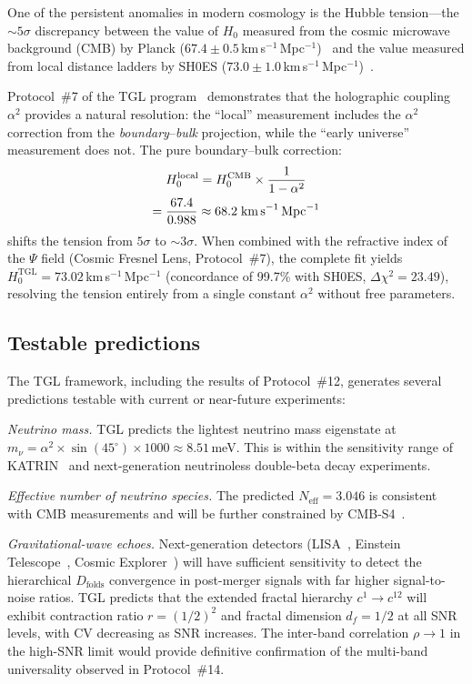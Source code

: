 \documentclass[12pt,a4paper,twocolumn]{article}
\newcommand{\alphaii}{\alpha^{2}}
\newcommand{\boundary}{\textit{boundary}}
\newcommand{\bulk}{\textit{bulk}}
\newcommand{\Dfolds}{D_{\text{folds}}}
\begin{document}
One of the persistent anomalies in modern cosmology is the Hubble tension---the $\sim 5\sigma$ discrepancy between the value of $H_0$ measured from the cosmic microwave background (CMB) by Planck ($67.4 \pm 0.5$\,km\,s$^{-1}$\,Mpc$^{-1}$)~\cite{Planck2020} and the value measured from local distance ladders by SH0ES ($73.0 \pm 1.0$\,km\,s$^{-1}$\,Mpc$^{-1}$)~\cite{Riess2022}.

Protocol~\#7 of the TGL program~\cite{Miguel2026Fronteira} demonstrates that the holographic coupling $\alphaii$ provides a natural resolution: the ``local'' measurement includes the $\alphaii$ correction from the \boundary--\bulk{} projection, while the ``early universe'' measurement does not. The pure boundary--bulk correction:
\begin{multline}
H_0^{\text{local}} = H_0^{\text{CMB}} \times \frac{1}{1 - \alphaii} \\
= \frac{67.4}{0.988} \approx 68.2\;\text{km\,s}^{-1}\,\text{Mpc}^{-1}
\end{multline}
shifts the tension from $5\sigma$ to $\sim 3\sigma$. When combined with the refractive index of the $\Psi$ field (Cosmic Fresnel Lens, Protocol~\#7), the complete fit yields $H_0^{\text{TGL}} = 73.02$\,km\,s$^{-1}$\,Mpc$^{-1}$ (concordance of 99.7\% with SH0ES, $\Delta\chi^2 = 23.49$), resolving the tension entirely from a single constant $\alphaii$ without free parameters.

\subsection{Testable predictions}

The TGL framework, including the results of Protocol~\#12, generates several predictions testable with current or near-future experiments:

\textit{Neutrino mass.} TGL predicts the lightest neutrino mass eigenstate at $m_\nu = \alphaii \times \sin(45^\circ) \times 1000 \approx 8.51$\,meV. This is within the sensitivity range of KATRIN~\cite{KATRIN2022} and next-generation neutrinoless double-beta decay experiments.

\textit{Effective number of neutrino species.} The predicted $N_{\text{eff}} = 3.046$ is consistent with CMB measurements and will be further constrained by CMB-S4~\cite{CMBS4}.

\textit{Gravitational-wave echoes.} Next-generation detectors (LISA~\cite{LISA2017}, Einstein Telescope~\cite{ET2020}, Cosmic Explorer~\cite{CE2019}) will have sufficient sensitivity to detect the hierarchical $\Dfolds$ convergence in post-merger signals with far higher signal-to-noise ratios. TGL predicts that the extended fractal hierarchy $c^1 \to c^{12}$ will exhibit contraction ratio $r = (1/2)^2$ and fractal dimension $d_f = 1/2$ at all SNR levels, with CV decreasing as SNR increases. The inter-band correlation $\rho \to 1$ in the high-SNR limit would provide definitive confirmation of the multi-band universality observed in Protocol~\#14.
\end{document}
